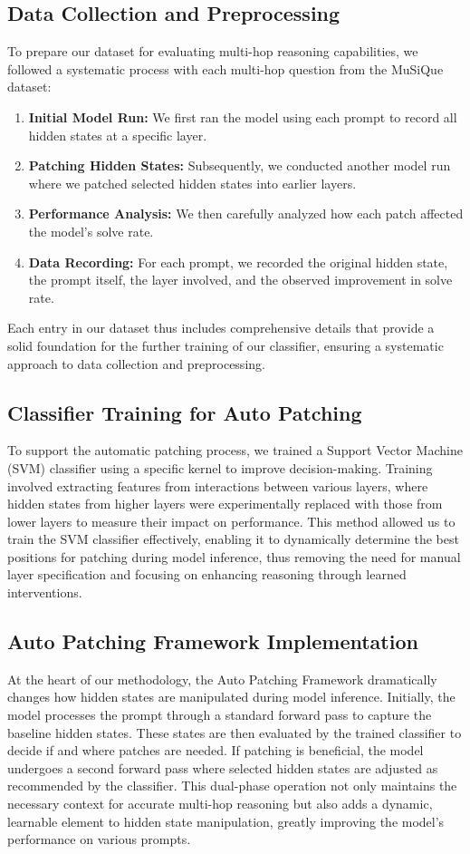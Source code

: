 \documentclass[11pt]{article}
\begin{document}
\subsection{Data Collection and Preprocessing}
To prepare our dataset for evaluating multi-hop reasoning capabilities, we followed a systematic process with each multi-hop question from the MuSiQue dataset:
\begin{enumerate}
    \item \textbf{Initial Model Run:} We first ran the model using each prompt to record all hidden states at a specific layer.
    \item \textbf{Patching Hidden States:} Subsequently, we conducted another model run where we patched selected hidden states into earlier layers.
    \item \textbf{Performance Analysis:} We then carefully analyzed how each patch affected the model’s solve rate.
    \item \textbf{Data Recording:} For each prompt, we recorded the original hidden state, the prompt itself, the layer involved, and the observed improvement in solve rate.
\end{enumerate}
Each entry in our dataset thus includes comprehensive details that provide a solid foundation for the further training of our classifier, ensuring a systematic approach to data collection and preprocessing.

\subsection{Classifier Training for Auto Patching}
To support the automatic patching process, we trained a Support Vector Machine (SVM) classifier using a specific kernel to improve decision-making. Training involved extracting features from interactions between various layers, where hidden states from higher layers were experimentally replaced with those from lower layers to measure their impact on performance. This method allowed us to train the SVM classifier effectively, enabling it to dynamically determine the best positions for patching during model inference, thus removing the need for manual layer specification and focusing on enhancing reasoning through learned interventions.

\subsection{Auto Patching Framework Implementation}
At the heart of our methodology, the Auto Patching Framework dramatically changes how hidden states are manipulated during model inference. Initially, the model processes the prompt through a standard forward pass to capture the baseline hidden states. These states are then evaluated by the trained classifier to decide if and where patches are needed. If patching is beneficial, the model undergoes a second forward pass where selected hidden states are adjusted as recommended by the classifier. This dual-phase operation not only maintains the necessary context for accurate multi-hop reasoning but also adds a dynamic, learnable element to hidden state manipulation, greatly improving the model's performance on various prompts.
\end{document}
